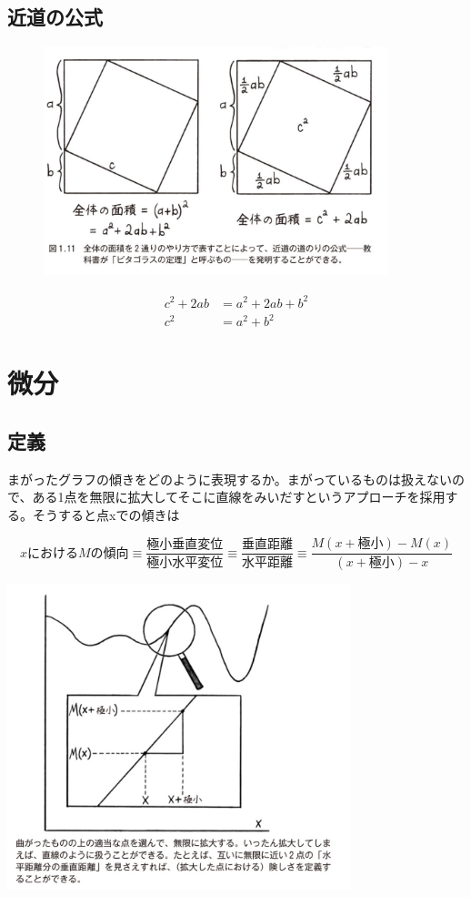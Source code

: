 \documentclass[dvipdfmx]{jsarticle}
\begin{document}
\subsection{近道の公式}

\begin{figure}
  \centering
  \includegraphics[width=10cm]{images/burn_math_1-11.png}
\end{figure}

\begin{align*}
  c^2 + 2ab &= a^2 + 2ab + b^2 \\
  c^2 &= a^2 + b^2
\end{align*}

\section{微分}

\subsection{定義}
まがったグラフの傾きをどのように表現するか。まがっているものは扱えないので、ある1点を無限に拡大してそこに直線をみいだすというアプローチを採用する。そうすると点xでの傾きは

\[ xにおけるMの傾向 \equiv \frac{極小垂直変位}{極小水平変位} \equiv \frac{垂直距離}{水平距離} \equiv \frac{M(x+極小) - M(x)}{(x + 極小) -x } \]

  \includegraphics[width=10cm]{images/burn_math_2-1.png}
\end{document}
